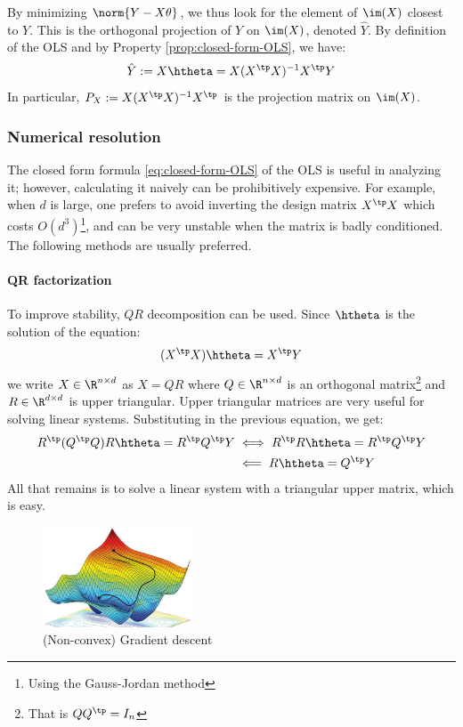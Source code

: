 \documentclass[toc]{../cs-classes/cs-classes}
\begin{document}
By minimizing $\norm{Y-X\theta}$, we thus look for the element of $\im(X)$ closest to $Y$. This is the orthogonal projection of $Y$ on $\im(X)$, denoted $\hat{Y}$. By definition of the OLS and by Property \ref{prop:closed-form-OLS}, we have:
\begin{equation*}
    \hat{Y} := X\htheta = X(X^\tp X)^{-1}X^\tp Y
\end{equation*}
In particular, $P_X:=X(X^\tp X)^{-1}X^\tp$ is the projection matrix on $\im(X)$.

\subsubsection{Numerical resolution}
The closed form formula \eqref{eq:closed-form-OLS} of the OLS is useful in analyzing it; however, calculating it naively can be prohibitively expensive. For example, when $d$ is large, one prefers to avoid inverting the design matrix $X^\tp X$ which costs $O(d^3)$\footnote{Using the Gauss-Jordan method}, and can be very unstable when the matrix is badly conditioned. The following methods are usually preferred.

\paragraph*{QR factorization}
To improve stability, $QR$ decomposition can be used. Since $\htheta$ is the solution of the equation:
\begin{equation*}
    (X^\tp X)\htheta = X^\tp Y
\end{equation*}
we write $X\in\R^{n\times d}$ as $X=QR$ where $Q\in\R^{n\times d}$ is an orthogonal matrix\footnote{That is $QQ^\tp=I_n$} and $R\in\R^{d\times d}$ is upper triangular. Upper triangular matrices are very useful for solving linear systems. Substituting in the previous equation, we get:
\begin{equation*}
    \begin{aligned}
        R^\tp(Q^\tp Q)R\htheta = R^\tp Q^\tp Y &\iff R^\tp R\htheta = R^\tp Q^\tp Y \\
        &\impliedby R\htheta = Q^\tp Y
    \end{aligned}
\end{equation*}
All that remains is to solve a linear system with a triangular upper matrix, which is easy.

\begin{figure}
    \centering
    \includegraphics[width=0.4\textwidth]{images/gradient-descent.jpg}
    \caption{(Non-convex) Gradient descent}
\end{figure}
\end{document}
